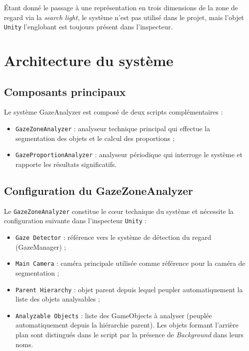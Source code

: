 \documentclass[12pt]{report}
\begin{document}
Étant donné le passage à une représentation en trois dimensions de la zone de regard via la \textit{search light}, le système n'est pas utilisé dans le projet, mais l'objet \texttt{Unity} l'englobant est toujours présent dans l'inspecteur.

\section{Architecture du système}
\subsection{Composants principaux}
Le système GazeAnalyzer est composé de deux scripts complémentaires :

\begin{itemize}
    \vspace{2mm}
    \item \texttt{GazeZoneAnalyzer} : analyseur technique principal qui effectue la segmentation des objets et le calcul des proportions ;
    \vspace{2mm}
    \item \texttt{GazeProportionAnalyzer} : analyseur périodique qui interroge le système et rapporte les résultats significatifs.
    \vspace{2mm}
\end{itemize}

\subsection{Configuration du GazeZoneAnalyzer}
Le \texttt{GazeZoneAnalyzer} constitue le cœur technique du système et nécessite la configuration suivante dans l'inspecteur \texttt{Unity} :

\begin{itemize}
    \vspace{2mm}
    \item \texttt{Gaze Detector} : référence vers le système de détection du regard (GazeManager) ;
    \vspace{2mm}
    \item \texttt{Main Camera} : caméra principale utilisée comme référence pour la caméra de segmentation ;
    \vspace{2mm}
    \item \texttt{Parent Hierarchy} : objet parent depuis lequel peupler automatiquement la liste des objets analysables ;
    \vspace{2mm}
    \item \texttt{Analyzable Objects} : liste des GameObjects à analyser (peuplée automatiquement depuis la hiérarchie parent). Les objets formant l'arrière plan sont distingués dans le script par la présence de \textit{Background} dans leurs noms.
    \vspace{2mm}
\end{itemize}
\end{document}
